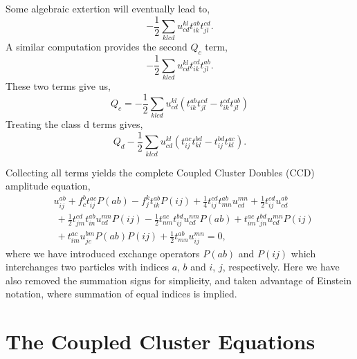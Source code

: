 Some algebraic extertion will eventually lead to,
\begin{equation}
    - \frac{1}{2} \sum_{klcd} u^{kl}_{cd}
        t^{ab}_{ik} t^{cd}_{jl}.
\end{equation}
A similar computation provides the second $Q_c$ term,
\begin{equation}
    - \frac{1}{2} \sum_{klcd} u^{kl}_{cd}
        t^{cd}_{ik} t^{ab}_{jl}.
\end{equation}
These two terms give us,
\begin{equation}
    Q_c = - \frac{1}{2} \sum_{klcd} u^{kl}_{cd}
        (t^{ab}_{ik}t^{cd}_{jl} - t^{cd}_{ik}t^{ab}_{jl})
\end{equation}
Treating the class d terms gives,
\begin{equation}
    Q_d - \frac{1}{2} \sum_{klcd} u^{kl}_{cd}
        (t^{ac}_{ij}t^{bd}_{kl} - t^{bd}_{ij}t^{ac}_{kl}).
\end{equation}

Collecting all terms yields the complete Coupled Cluster Doubles (CCD) amplitude equation,
\begin{equation}
    \begin{aligned} 
        &u^{ab}_{ij} + f^b_c t^{ac}_{ij} P(ab) - f^k_j t^{ab}_{ik} P(ij)
        + \frac{1}{4}t^{cd}_{ij}t^{ab}_{mn} u^{mn}_{cd} + \frac{1}{2}t^{cd}_{ij}u^{ab}_{cd} \\
        &\ + \frac{1}{2}t^{cd}_{jm}t^{ab}_{in}u^{mn}_{cd}P(ij)
        - \frac{1}{2}t^{ac}_{nm}t^{bd}_{ij}u^{nm}_{cd}P(ab) 
        + t^{ac}_{im}t^{bd}_{jn}u^{mn}_{cd}P(ij) \\
        &\ + t^{ac}_{im}u^{bm}_{jc}P(ab)P(ij)
        + \frac{1}{2}t^{ab}_{mn}u^{mn}_{ij} = 0,
    \end{aligned}
\end{equation}
where we have introduced exchange operators $P(ab)$ and $P(ij)$ which interchanges two 
particles with indices $a$, $b$ and $i$, $j$, respectively. Here we have also removed 
the summation signs for simplicity, and taken advantage of Einstein notation, where 
summation of equal indices is implied.


\section{The Coupled Cluster Equations}

